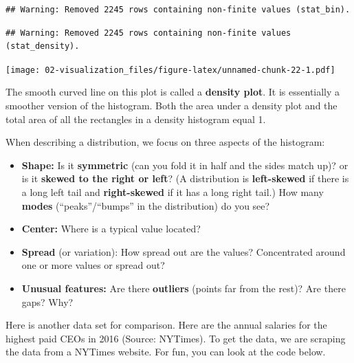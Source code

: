 \documentclass[
]{book}
\providecommand{\tightlist}{%
  \setlength{\itemsep}{0pt}\setlength{\parskip}{0pt}}
\begin{document}
\begin{verbatim}
## Warning: Removed 2245 rows containing non-finite values (stat_bin).
\end{verbatim}

\begin{verbatim}
## Warning: Removed 2245 rows containing non-finite values (stat_density).
\end{verbatim}

\texttt{[image: 02-visualization\_files/figure-latex/unnamed-chunk-22-1.pdf]}

The smooth curved line on this plot is called a \textbf{density plot}. It is essentially a smoother version of the histogram. Both the area under a density plot and the total area of all the rectangles in a density histogram equal 1.

When describing a distribution, we focus on three aspects of the histogram:

\begin{itemize}
\tightlist
\item
  \textbf{Shape:} Is it \textbf{symmetric} (can you fold it in half and the sides match up)? or is it \textbf{skewed to the right or left}? (A distribution is \textbf{left-skewed} if there is a long left tail and \textbf{right-skewed} if it has a long right tail.) How many \textbf{modes} (``peaks''/``bumps'' in the distribution) do you see?
\item
  \textbf{Center:} Where is a typical value located?
\item
  \textbf{Spread} (or variation): How spread out are the values? Concentrated around one or more values or spread out?
\item
  \textbf{Unusual features:} Are there \textbf{outliers} (points far from the rest)? Are there gaps? Why?
\end{itemize}

Here is another data set for comparison. Here are the annual salaries for the highest paid CEOs in 2016 (Source: NYTimes). To get the data, we are scraping the data from a NYTimes website. For fun, you can look at the code below.
\end{document}
